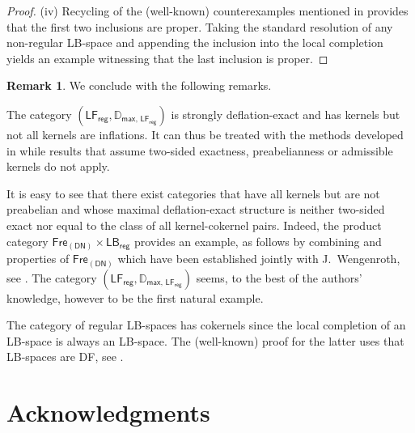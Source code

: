 \documentclass[11pt, a4paper, reqno]{amsart}
\theoremstyle{definition}
\newtheorem{rmk}[thm]{Remark}
\newcommand{\DD}{\mathbb{D}}
\newcommand{\diam}{\hfill\raisebox{-8pt}{\scalebox{0.9}{\rotatebox{45}{$\qed$}}}}
\newcommand{\FreDN}{\mathsf{Fre}_{\mathsf{(DN)}}}
\newcommand{\LBr}{\mathsf{LB}_{\mathsf{reg}}}
\newcommand{\LFr}{\mathsf{LF}_{\mathsf{reg}}}
\begin{document}
\begin{proof}
\smallskip

(iv) Recycling of the (well-known) counterexamples mentioned in \cite[Ex 4.16 and Ex 4.14]{W25} provides that the first two inclusions are proper. Taking the standard resolution of any non-regular LB-space and appending the inclusion into the local completion yields an example witnessing that the last inclusion is proper.
\end{proof}


\begin{rmk} We conclude with the following remarks.\vspace{1pt}

\begin{compactitem}

\item[(i)] The category $(\LFr, \DD_{\mathsf{max},\,\LFr})$ is strongly deflation-exact and has kernels but not all kernels are inflations. It can thus be treated with the methods developed in \cite{HKRW,LW26} while results that assume two-sided exactness, preabelianness or admissible kernels do not apply.\vspace{2pt}

\item[(ii)] It is easy to see that there exist categories that have all kernels but are not preabelian and whose maximal deflation-exact structure is neither two-sided exact nor equal to the class of all kernel-cokernel pairs. Indeed, the product category $\FreDN\times\LBr$ provides an example, as follows by combining \cite[Rmk 4.8]{W25} and properties of $\FreDN$ which have been established jointly with J.~Wengenroth, see \cite[Section 7]{LW26}. The category $(\LFr, \DD_{\mathsf{max},\,\LFr})$ seems, to the best of the authors' knowledge, however to be the first natural example.\vspace{2pt}

\item[(iii)] The category of regular LB-spaces has cokernels since the local completion of an LB-space is always an LB-space. The (well-known) proof for the latter uses that LB-spaces are DF, see \cite[Lem 4.3]{W25}.\diam

\end{compactitem}
\end{rmk}

\section*{Acknowledgments}

\vspace{-2pt}
\end{document}
